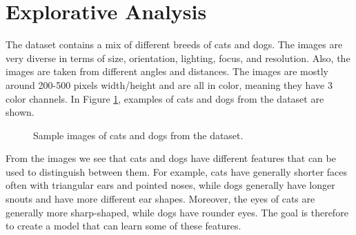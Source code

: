 \section{Explorative Analysis}
The dataset contains a mix of different breeds of cats and dogs. The images are very diverse in terms of size, orientation, lighting, focus, and resolution. Also, the images are taken from different angles and distances. The images are mostly around 200-500 pixels width/height and are all in color, meaning they have 3 color channels. In Figure \ref{fig:cats_dogs}, examples of cats and dogs from the dataset are shown.
\begin{figure}[H]
    \vspace*{-0.7cm}
    \centering
    \hspace{0.4cm}
    \caption{Sample images of cats and dogs from the dataset.}
    \label{fig:cats_dogs}
    \vspace*{-0.7cm}
\end{figure}

From the images we see that cats and dogs have different features that can be used to distinguish between them.
For example, cats have generally shorter faces often with triangular ears and pointed noses,
while dogs generally have longer snouts and have more different ear shapes.
Moreover, the eyes of cats are generally more sharp-shaped, while dogs have rounder eyes. The goal is therefore to create a model that can learn some of these features.